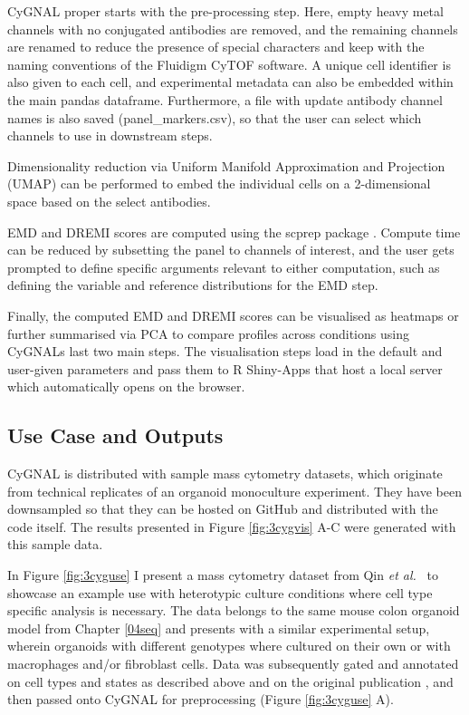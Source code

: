 CyGNAL proper starts with the pre-processing step. Here, empty heavy metal channels with no conjugated antibodies are removed, and the remaining channels are renamed to reduce the presence of special characters and keep with the naming conventions of the Fluidigm CyTOF software. A unique cell identifier is also given to each cell, and experimental metadata can also be embedded within the main pandas dataframe. Furthermore, a file with update antibody channel names is also saved (panel\_markers.csv), so that the user can select which channels to use in downstream steps.

Dimensionality reduction via Uniform Manifold Approximation and Projection (UMAP) \cite{mcinnes_umap_2020} can be performed to embed the individual cells on a 2-dimensional space based on the select antibodies.

EMD and DREMI scores are computed using the scprep package \cite{noauthor_krishnaswamylabscprep_2021}. Compute time can be reduced by subsetting the panel to channels of interest, and the user gets prompted to define specific arguments relevant to either computation, such as defining the variable and reference distributions for the EMD step.

Finally, the computed EMD and DREMI scores can be visualised as heatmaps or further summarised via PCA to compare profiles across conditions using CyGNALs last two main steps. The visualisation steps load in the default and user-given parameters and pass them to R Shiny-Apps \cite{noauthor_rstudioshiny_2021} that host a local server which automatically opens on the browser.

\subsection{Use Case and Outputs}

CyGNAL is distributed with sample mass cytometry datasets, which originate from technical replicates of an organoid monoculture experiment. They have been downsampled so that they can be hosted on GitHub and distributed with the code itself. The results presented in Figure \ref{fig:3cygvis} A-C were generated with this sample data.

In Figure \ref{fig:3cyguse} I present a mass cytometry dataset from Qin \emph{et al.}~\cite{qin_cell-type-specific_2020} to showcase an example use with heterotypic culture conditions where cell type specific analysis is necessary. The data belongs to the same mouse colon organoid model from Chapter \ref{04seq} and presents with a similar experimental setup, wherein organoids with different genotypes where cultured on their own or with macrophages and/or fibroblast cells. Data was subsequently gated and annotated on cell types and states as described above and on the original publication \cite{qin_cell-type-specific_2020}, and then passed onto CyGNAL for preprocessing (Figure \ref{fig:3cyguse} A).

